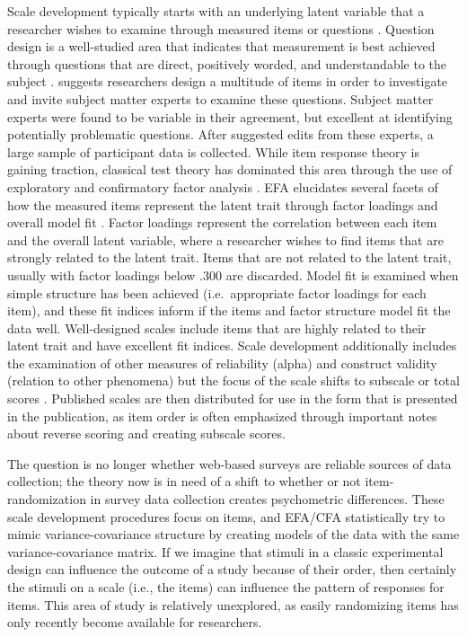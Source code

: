 \documentclass[english,man, mask]{apa6}
\theoremstyle{definition}
\theoremstyle{definition}
\theoremstyle{definition}
\theoremstyle{remark}
\begin{document}
Scale development typically starts with an underlying latent variable
that a researcher wishes to examine through measured items or questions
\autocite{DeVellis2016a}. Question design is a well-studied area that
indicates that measurement is best achieved through questions that are
direct, positively worded, and understandable to the subject
\autocite{Dillman2008}. \textcite{Olson2010} suggests researchers design
a multitude of items in order to investigate and invite subject matter
experts to examine these questions. Subject matter experts were found to
be variable in their agreement, but excellent at identifying potentially
problematic questions. After suggested edits from these experts, a large
sample of participant data is collected. While item response theory is
gaining traction, classical test theory has dominated this area through
the use of exploratory and confirmatory factor analysis \autocite[EFA,
CFA;][]{Worthington2006}. EFA elucidates several facets of how the
measured items represent the latent trait through factor loadings and
overall model fit \autocite{Tabachnick2012}. Factor loadings represent
the correlation between each item and the overall latent variable, where
a researcher wishes to find items that are strongly related to the
latent trait. Items that are not related to the latent trait, usually
with factor loadings below .300 \autocite{Preacher2003} are discarded.
Model fit is examined when simple structure has been achieved
(i.e.~appropriate factor loadings for each item), and these fit indices
inform if the items and factor structure model fit the data well.
Well-designed scales include items that are highly related to their
latent trait and have excellent fit indices. Scale development
additionally includes the examination of other measures of reliability
(alpha) and construct validity (relation to other phenomena) but the
focus of the scale shifts to subscale or total scores
\autocite{Buchanan2014}. Published scales are then distributed for use
in the form that is presented in the publication, as item order is often
emphasized through important notes about reverse scoring and creating
subscale scores.

The question is no longer whether web-based surveys are reliable sources
of data collection; the theory now is in need of a shift to whether or
not item-randomization in survey data collection creates psychometric
differences. These scale development procedures focus on items, and
EFA/CFA statistically try to mimic variance-covariance structure by
creating models of the data with the same variance-covariance matrix. If
we imagine that stimuli in a classic experimental design can influence
the outcome of a study because of their order, then certainly the
stimuli on a scale (i.e., the items) can influence the pattern of
responses for items. This area of study is relatively unexplored, as
easily randomizing items has only recently become available for
researchers.
\end{document}
